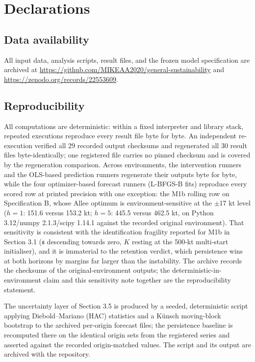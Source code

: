 \documentclass[11pt]{article}
\begin{document}
\section*{Declarations}

\subsection*{Data availability}

All input data, analysis scripts, result files, and the frozen model
specification are archived at
\url{https://github.com/MIKEAA2020/general-sustainability} and
\url{https://zenodo.org/records/22553609}.

\subsection*{Reproducibility}

All computations are deterministic: within a fixed interpreter and
library stack, repeated executions reproduce every result file byte for
byte. An independent re-execution verified all 29 recorded output
checksums and regenerated all 30 result files byte-identically; one
registered file carries no pinned checksum and is covered by the
regeneration comparison. Across environments, the intervention runners
and the OLS-based prediction runners regenerate their outputs byte for
byte, while the four optimizer-based forecast runners (L-BFGS-B fits)
reproduce every scored row at printed precision with one exception: the
M1b rolling row on Specification B, whose Allee optimum is
environment-sensitive at the \ensuremath{\pm}17 kt level (\(h=1\): 151.6
versus 153.2 kt; \(h=5\): 445.5 versus 462.5 kt, on Python
3.12/numpy 2.1.3/scipy 1.14.1 against the recorded original
environment). That sensitivity is consistent with the identification
fragility reported for M1b in Section 3.1 (\(\mathfrak s\) descending
towards zero, \(K\) resting at the 500-kt multi-start initialiser), and
it is immaterial to the retention verdict, which persistence wins at
both horizons by margins far larger than the instability. The archive
records the checksums of the original-environment outputs; the
deterministic-in-environment claim and this sensitivity note together
are the reproducibility statement.

The uncertainty layer of Section 3.5 is produced by a seeded,
deterministic script applying Diebold--Mariano (HAC) statistics and a
K\"unsch moving-block bootstrap to the archived per-origin forecast
files; the persistence baseline is recomputed there on the identical
origin sets from the registered series and asserted against the recorded
origin-matched values. The script and its output are archived with the
repository.
\end{document}
